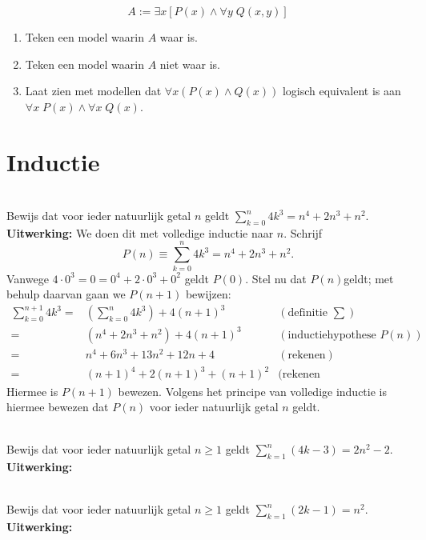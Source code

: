\begin{answer}
$$A:=\exists x[P(x)\wedge\forall y\;Q(x,y)]$$
\begin{enumerate}[label=\textit{\alph*.}]
\item Teken een model waarin $A$ waar is.
\item Teken een model waarin $A$ niet waar is.
\item Laat zien met modellen dat $\forall x(P(x)\wedge Q(x))$ logisch equivalent is aan $\forall x\; P(x)\wedge\forall x\;Q(x)$.
\end{enumerate}
\end{answer}

\section{Inductie}
\setcounter{answerT}{0}
\begin{answer}\mbox{}\\
Bewijs dat voor ieder natuurlijk getal $n$ geldt $\sum\limits^{n}_{k=0} 4k^3=n^4+2n^3+n^2$.\\[2.5pt]

\noindent\textbf{Uitwerking:} We doen dit met volledige inductie naar $n$. Schrijf
$$P(n)\equiv\sum\limits^{n}_{k=0} 4k^3=n^4+2n^3+n^2.$$
Vanwege $4\cdot 0^3=0=0^4+2\cdot 0^3+0^2$ geldt $P(0)$. Stel nu dat $P(n)$geldt; met behulp daarvan gaan we $P(n+1)$ bewijzen:
$$\begin{array}{rll}
      \sum^{n+1}_{k=0}4k^3= & (\sum^n_{k=0}4k^3)+4(n+1)^3&(\text{definitie }\sum)\\
      = & (n^4+2n^3+n^2)+4(n+1)^3&(\text{inductiehypothese }P(n))\\
      = & n^4+6n^3+13n^2+12n+4 & (\text{rekenen})\\
      = & (n+1)^4+2(n+1)^3+(n+1)^2 & (\text{rekenen}
\end{array}$$
Hiermee is $P(n+1)$ bewezen. Volgens het principe van volledige inductie is hiermee bewezen dat $P(n)$ voor ieder natuurlijk getal $n$ geldt.
\end{answer}

\begin{answer}\mbox{}\\
Bewijs dat voor ieder natuurlijk getal $n\geq 1$ geldt $\sum\limits^{n}_{k=1}(4k-3)=2n^2-2$.\\[2.5pt]

\noindent\textbf{Uitwerking:}\todo
\end{answer}

\begin{answer}\mbox{}\\
Bewijs dat voor ieder natuurlijk getal $n\geq 1$ geldt $\sum\limits^n_{k=1}(2k-1)=n^2$.\\[2.5pt]

\noindent\textbf{Uitwerking:}\todo
\end{answer}


